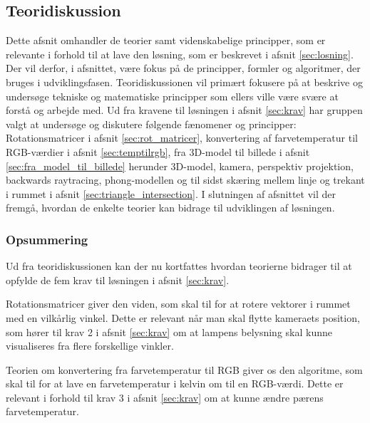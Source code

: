 \subsection{Teoridiskussion}
\label{sec:teori}

Dette afsnit omhandler de teorier samt videnskabelige principper, som er relevante i forhold til at lave den løsning, som er beskrevet i afsnit \ref{sec:losning}. Der vil derfor, i afsnittet, være fokus på de principper, formler og algoritmer, der bruges i udviklingsfasen. Teoridiskussionen vil primært fokusere på at beskrive og undersøge tekniske og matematiske principper som ellers ville være svære at forstå og arbejde med. Ud fra kravene til løsningen i afsnit \ref{sec:krav} har gruppen valgt at undersøge og diskutere følgende fænomener og principper: Rotationsmatricer i afsnit \ref{sec:rot_matricer}, konvertering af farvetemperatur til RGB-værdier i afsnit \ref{sec:temptilrgb}, fra 3D-model til billede i afsnit \ref{sec:fra_model_til_billede} herunder 3D-model, kamera, perspektiv projektion, backwards raytracing, phong-modellen og til sidst skæring mellem linje og trekant i rummet i afsnit \ref{sec:triangle_intersection}. I slutningen af afsnittet vil der fremgå, hvordan de enkelte teorier kan bidrage til udviklingen af løsningen.











\subsubsection*{Opsummering}

Ud fra teoridiskussionen kan der nu kortfattes hvordan teorierne bidrager til at opfylde de fem krav til løsningen i afsnit \ref{sec:krav}. 

Rotationsmatricer giver den viden, som skal til for at rotere vektorer i rummet med en vilkårlig vinkel. Dette er relevant når man skal flytte kameraets position, som hører til krav 2 i afsnit \ref{sec:krav} om at lampens belysning skal kunne visualiseres fra flere forskellige vinkler.

Teorien om konvertering fra farvetemperatur til RGB giver os den algoritme, som skal til for at lave en farvetemperatur i kelvin om til en RGB-værdi. Dette er relevant i forhold til krav 3 i afsnit \ref{sec:krav} om at kunne ændre pærens farvetemperatur. 

